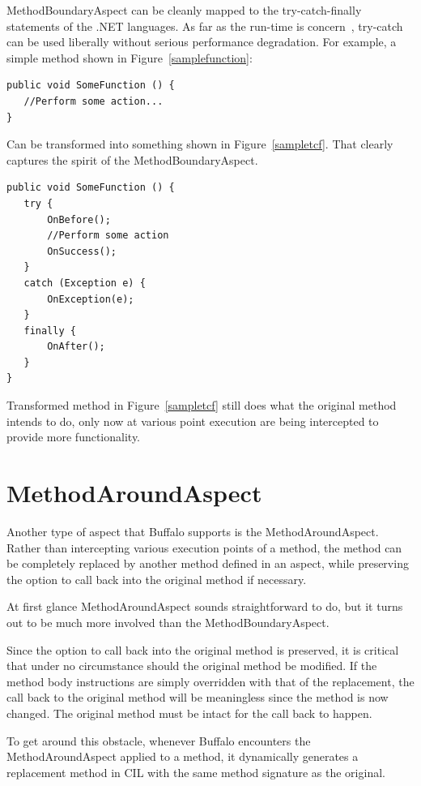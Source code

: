 MethodBoundaryAspect can be cleanly mapped to the try-catch-finally statements of the .NET languages. As far as the run-time is concern~\cite{ecma334, ecma335}, try-catch can be used liberally without serious performance degradation. For example, a simple method shown in Figure~\ref{samplefunction}:

\begin{lstlisting}[caption={Sample function}, label=samplefunction]
public void SomeFunction () {
   //Perform some action...
}
\end{lstlisting}

Can be transformed into something shown in Figure~\ref{sampletcf}. That clearly captures the spirit of the MethodBoundaryAspect.

\begin{lstlisting}[caption={Sample try-catch-finally}, label=sampletcf]
public void SomeFunction () {
   try {
       OnBefore();
       //Perform some action
       OnSuccess();
   }
   catch (Exception e) {
       OnException(e);
   }
   finally {
       OnAfter();
   }
}
\end{lstlisting}

Transformed method in Figure~\ref{sampletcf} still does what the original method intends to do, only now at various point execution are being intercepted to provide more functionality. 

\section{MethodAroundAspect}
Another type of aspect that Buffalo supports is the MethodAroundAspect. Rather than intercepting various execution points of a method, the method can be completely replaced by another method defined in an aspect, while preserving the option to call back into the original method if necessary.

At first glance MethodAroundAspect sounds straightforward to do, but it turns out to be much more involved than the MethodBoundaryAspect.

Since the option to call back into the original method is preserved, it is critical that under no circumstance should the original method be modified. If the method body instructions are simply overridden with that of the replacement, the call back to the original method will be meaningless since the method is now changed. The original method must be intact for the call back to happen.

To get around this obstacle, whenever Buffalo encounters the MethodAroundAspect applied to a method, it dynamically generates a replacement method in CIL with the same method signature as the original.

